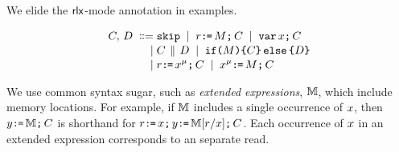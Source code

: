 We elide the ${\mathsf{rlx}}$-mode annotation in examples.
\begin{comment}
\footnote{We only consider executions where register state is empty in
  forked threads.  Given item~\ref{pre-acquire} of
  Definition~\ref{def:prefix}, a sufficient condition is that parallel
  composition is always preceded by an acquire fence, as in programs of the
  form:
  \begin{displaymath}
    \VAR\vec{\aLoc}\SEMI
    \vec{\aLoc}\GETS\vec{0}\SEMI
    \vec{\bLoc}\GETS\vec{0}\SEMI
    \FENCE\SEMI
    (\aCmd^1 \PAR \cdots \PAR \aCmd^n)
  \end{displaymath}
  where $\aCmd^1$, \ldots, $\aCmd^n$ do not include $\PAR$.  To avoid clutter
  in drawings, we often drop the explicit fence.}.
\end{comment}
\begin{align*}
C,\,D
\;\mathrel{\mathord{\vcentcolon}\mkern-1mu\mathord{\vcentcolon}\mathord{{=}}}\;& \texttt{skip}
\;\mathrel{|}\; r\texttt{:}\mkern-1mu\texttt{=}\,M\texttt{;}\,\allowbreak C
\;\mathrel{|}\; \texttt{var}\,x\texttt{;}\,\allowbreak C
\\[-.5ex]
\;\mathrel{|}\;&C \,\mathbin{\|}\, D
\;\mathrel{|}\; \texttt{if}\allowbreak\texttt{(}M\texttt{)} \allowbreak\texttt{\{} C \texttt{\}}\,\allowbreak\texttt{else}\allowbreak\,\texttt{\{} D \texttt{\}}
\\[-.5ex]
\;\mathrel{|}\;& r\texttt{:}\mkern-1mu\texttt{=}\,x^{\mu}\texttt{;}\,\allowbreak C 
\;\mathrel{|}\; x^{\mu}\texttt{:}\mkern-1mu\texttt{=}\,M\texttt{;}\,\allowbreak C
\end{align*}




We use common syntax sugar, such as \emph{extended expressions}, $\mathbb{M}$,
which include memory locations.  For example, if $\mathbb{M}$ includes a single
occurrence of $x$, then $y\texttt{:}\mkern-1mu\texttt{=}\,\mathbb{M}\texttt{;}\,\allowbreak C$ is shorthand for
$r\texttt{:}\mkern-1mu\texttt{=}\,x\texttt{;}\,\allowbreak y\texttt{:}\mkern-1mu\texttt{=}\,\mathbb{M}[r/x]\texttt{;}\,\allowbreak C$.  Each
occurrence of $x$ in an extended expression corresponds to an separate
read.

